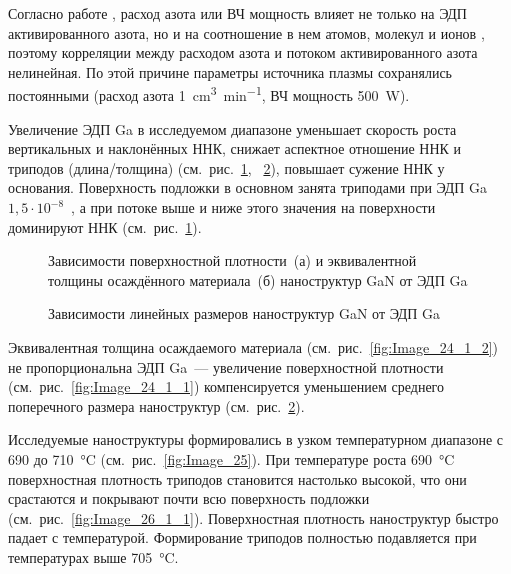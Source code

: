 Согласно работе \cite{Voulot1998}, расход азота или ВЧ мощность влияет не
только на ЭДП активированного азота, но и на соотношение в нем атомов, молекул
и ионов \cite{Blant2000}, поэтому корреляции между расходом азота и потоком
активированного азота нелинейная. По этой причине параметры источника плазмы
сохранялись постоянными (расход азота 1~\si{\centi\meter^3\per\minute}, ВЧ
мощность 500~\si{\watt}).

Увеличение ЭДП Ga в исследуемом диапазоне уменьшает скорость роста вертикальных
и наклонённых ННК, снижает аспектное отношение ННК и триподов (длина/толщина)
(см.~рис.~\cref{fig:Image_24_1},~ \cref{fig:Image_24_2}), повышает сужение ННК
у основания. Поверхность подложки в основном занята триподами при ЭДП Ga \(1,5
\cdot 10^{-8}\)~\si{\torr}, а при потоке выше и ниже этого значения на
поверхности доминируют ННК (см.~рис.~\cref{fig:Image_24_1}).

\begin{figure}[ht] 
			\caption{Зависимости поверхностной плотности~(а) и эквивалентной толщины
			осаждённого материала~(б) наноструктур GaN от ЭДП
		Ga}\label{fig:Image_24_1} \end{figure}

\begin{figure}[ht]  \caption{Зависимости
линейных размеров наноструктур GaN от ЭДП Ga}\label{fig:Image_24_2}
\end{figure}

Эквивалентная толщина осаждаемого материала (см.~рис.~\cref{fig:Image_24_1_2})
не пропорциональна ЭДП Ga~--- увеличение поверхностной плотности
(см.~рис.~\cref{fig:Image_24_1_1}) компенсируется уменьшением среднего
поперечного размера наноструктур (см.~рис.~\cref{fig:Image_24_2}).

Исследуемые наноструктуры формировались в узком температурном диапазоне с 690 до
710~\si{\degreeCelsius} (см.~рис.~\cref{fig:Image_25}). При температуре роста
690~\si{\degreeCelsius} поверхностная плотность триподов становится настолько
высокой, что они срастаются и покрывают почти всю поверхность подложки
(см.~рис.~\cref{fig:Image_26_1_1}). Поверхностная плотность наноструктур быстро
падает с температурой. Формирование триподов полностью подавляется при
температурах выше 705~\si{\degreeCelsius}.

